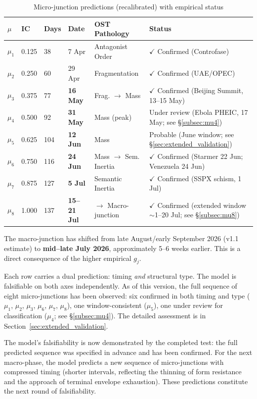 \documentclass[12pt,a4paper]{article}
\newcommand{\gj}{g_j}
\begin{document}
\begin{table}[H]
\centering
\caption{Micro-junction predictions (recalibrated) with empirical status}
\label{tab:micro_recal}
\begin{tabular}{@{}lllllp{3.2cm}@{}}
\toprule
$\mu$ & \textbf{IC} & \textbf{Days} & \textbf{Date} & \textbf{OST Pathology} & \textbf{Status} \\
\midrule
$\mu_1$ & 0.125 & 38 & 7 Apr & Antagonist Order & $\checkmark$ Confirmed (Controfase) \\
$\mu_2$ & 0.250 & 60 & 29 Apr & Fragmentation & $\checkmark$ Confirmed (UAE/OPEC) \\
$\mu_3$ & 0.375 & 77 & \textbf{16 May} & Frag. $\to$ Mass & $\checkmark$ Confirmed (Beijing Summit, 13--15 May) \\
$\mu_4$ & 0.500 & 92 & \textbf{31 May} & Mass (peak) & Under review (Ebola PHEIC, 17 May; see \S\ref{subsec:mu4}) \\
$\mu_5$ & 0.625 & 104 & \textbf{12 Jun} & Mass & Probable (June window; see \S\ref{sec:extended_validation}) \\
$\mu_6$ & 0.750 & 116 & \textbf{24 Jun} & Mass $\to$ Sem. Inertia & $\checkmark$ Confirmed (Starmer 22 Jun; Venezuela 24 Jun) \\
$\mu_7$ & 0.875 & 127 & \textbf{5 Jul} & Semantic Inertia & $\checkmark$ Confirmed (SSPX schism, 1 Jul) \\
$\mu_8$ & 1.000 & 137 & \textbf{15--21 Jul} & $\to$ Macro-junction & $\checkmark$ Confirmed (extended window $\sim$1--20 Jul; see \S\ref{subsec:mu8}) \\
\bottomrule
\end{tabular}
\end{table}

\noindent The macro-junction has shifted from late August/early September 2026 (v1.1 estimate) to \textbf{mid--late July 2026}, approximately 5--6 weeks earlier. This is a direct consequence of the higher empirical $\gj$.

Each row carries a dual prediction: timing \emph{and} structural type. The model is falsifiable on both axes independently. As of this version, the full sequence of eight micro-junctions has been observed: six confirmed in both timing and type ($\mu_1$, $\mu_2$, $\mu_3$, $\mu_6$, $\mu_7$, $\mu_8$), one window-consistent ($\mu_5$), one under review for classification ($\mu_4$; see \S\ref{subsec:mu4}). The detailed assessment is in Section~\ref{sec:extended_validation}.

The model's falsifiability is now demonstrated by the completed test: the full predicted sequence was specified in advance and has been confirmed. For the next macro-phase, the model predicts a new sequence of micro-junctions with compressed timing (shorter intervals, reflecting the thinning of form resistance and the approach of terminal envelope exhaustion). These predictions constitute the next round of falsifiability.
\end{document}
